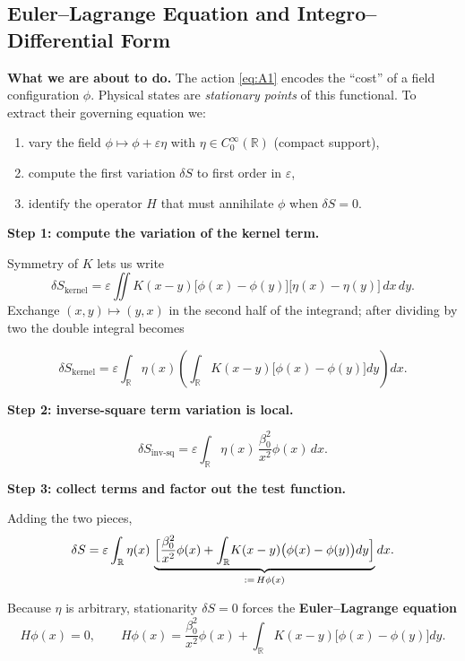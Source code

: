 \documentclass[11pt]{article}
\begin{document}
\subsection{Euler–Lagrange Equation and Integro–Differential Form}
\label{sec:LedgerEL}

\noindent
\textbf{What we are about to do.}\;
The action \eqref{eq:A1} encodes the “cost” of a field configuration
\(\phi\).  Physical states are \emph{stationary points} of this
functional.  To extract their governing equation we:

\begin{enumerate}
\item vary the field \(\phi\mapsto\phi+\varepsilon\eta\) with
      \(\eta\in C_{0}^{\infty}(\mathbb R)\) (compact support),  
\item compute the first variation \(\delta S\) to first order in
      \(\varepsilon\),  
\item identify the operator \(H\) that must annihilate \(\phi\) when
      \(\delta S=0\).  
\end{enumerate}

\vspace{.5em}
\noindent
\textbf{Step 1: compute the variation of the kernel term.}

Symmetry of \(K\) lets us write
\[
\delta S_{\mathrm{kernel}}
  = \varepsilon
    \iint K(x-y)\bigl[\phi(x)-\phi(y)\bigr]
                   \bigl[\eta(x)-\eta(y)\bigr]\,dx\,dy .
\]
Exchange \((x,y)\mapsto(y,x)\) in the second half of the integrand;
after dividing by two the double integral becomes

\[
\delta S_{\mathrm{kernel}}
  = \varepsilon
    \int_{\mathbb R}\eta(x)
      \left(
        \int_{\mathbb R}K(x-y)\bigl[\phi(x)-\phi(y)\bigr]dy
      \right)\!dx .
\]

\noindent
\textbf{Step 2: inverse-square term variation is local.}

\[
\delta S_{\mathrm{inv\text{-}sq}}
  = \varepsilon
    \int_{\mathbb R}\eta(x)\,
      \frac{\beta_{0}^{2}}{x^{2}}\phi(x)\,dx .
\]

\noindent
\textbf{Step 3: collect terms and factor out the test function.}

Adding the two pieces,
\[
\delta S
  = \varepsilon
    \int_{\mathbb R}\eta(x)\,
        \underbrace{\Bigl[
            \frac{\beta_{0}^{2}}{x^{2}}\phi(x)
            +\int_{\mathbb R}\!K(x-y)
                     \bigl(\phi(x)-\phi(y)\bigr)dy
        \Bigr]}_{:=\,H\phi(x)}dx .
\]

Because \(\eta\) is arbitrary, stationarity \(\delta S=0\) forces the
\textbf{Euler–Lagrange equation}
\begin{equation}
\label{eq:A2}
   H\phi(x)=0,
   \qquad
   H\phi(x)
   =\frac{\beta_{0}^{2}}{x^{2}}\phi(x)
    +\int_{\mathbb R}\!K(x-y)\bigl[\phi(x)-\phi(y)\bigr]dy .
\end{equation}
\end{document}
